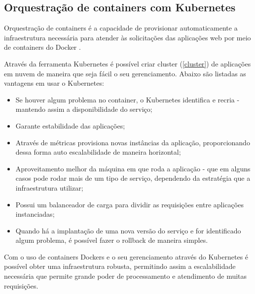 \subsection{Orquestração de containers com Kubernetes}\label{kubernetes}

\begin{citacao}
Orquestração de containers é a capacidade de provisionar automaticamente
a infraestrutura necessária para atender às solicitações das aplicações web
por meio de containers do Docker \cite{docker-kubernetes-e-openshift}.
\end{citacao}

Através da ferramenta Kubernetes é possível criar cluster (\autoref{cluster})
de aplicações em nuvem de maneira que seja fácil o seu gerenciamento.
Abaixo são listadas as vantagens em usar o Kubernetes:

\begin{itemize}

	\item Se houver algum problema no container, o Kubernetes identifica e recria -
          mantendo assim a disponibilidade do serviço;
    \item Garante estabilidade das aplicações;
    \item Através de métricas provisiona novas instâncias da aplicação,
          proporcionando dessa forma auto escalabilidade de maneira horizontal;
    \item Aproveitamento melhor da máquina em que roda a aplicação - que em alguns
          casos pode rodar mais de um tipo de serviço, dependendo da estratégia
          que a infraestrutura utilizar;
    \item Possui um balanceador de carga para dividir as requisições entre
          aplicações instanciadas;
    \item Quando há a implantação de uma nova versão do serviço e for identificado
          algum problema, é possível fazer o rollback de maneira simples.

\end{itemize}

Com o uso de containers Dockers e o seu gerenciamento através do Kubernetes é possível
obter uma infraestrutura robusta, permitindo assim a escalabilidade necessária que permite
grande poder de processamento e atendimento de muitas requisições.
